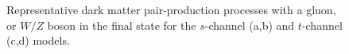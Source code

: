 \begin{figure}[t]
  \caption{Representative dark matter pair-production processes with a gluon, or $W/Z$ boson in the final state for the $s$-channel (a,b) and $t$-channel (c,d) models.}
  \label{allchannel_sig_phen}
\end{figure}

